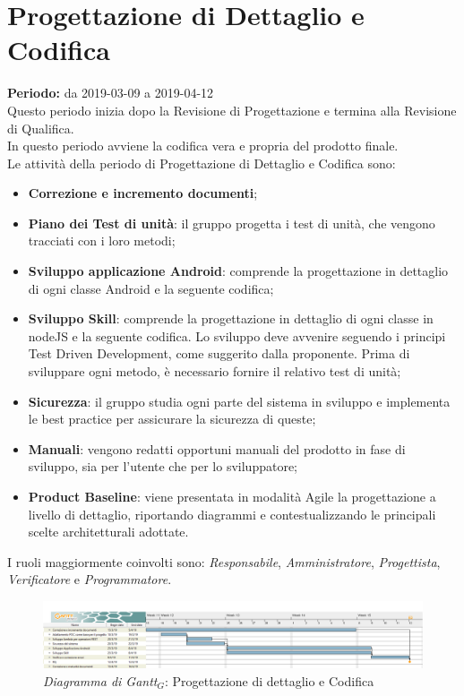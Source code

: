 \section{Progettazione di Dettaglio e Codifica}
\textbf{Periodo:} da 2019-03-09 a 2019-04-12\\
Questo periodo inizia dopo la Revisione di Progettazione e termina  alla Revisione di Qualifica.\\
In questo periodo avviene la codifica vera e propria del prodotto finale.\\
Le attività della periodo di Progettazione di Dettaglio e Codifica sono:
\begin{itemize}
	\item \textbf{Correzione e incremento documenti}; 
	\item \textbf{Piano dei Test di unità}: il gruppo progetta i test di unità, che vengono tracciati con i loro metodi; 
	\item \textbf{Sviluppo applicazione Android}: comprende la progettazione in dettaglio di ogni classe Android e la seguente codifica;
	\item \textbf{Sviluppo Skill}: comprende la progettazione in dettaglio di ogni classe in nodeJS e la seguente codifica. Lo sviluppo deve avvenire seguendo i principi Test Driven Development, come suggerito dalla proponente. Prima di sviluppare ogni metodo, è necessario fornire il relativo test di unità;
	\item \textbf{Sicurezza}: il gruppo studia ogni parte del sistema in sviluppo e implementa le best practice per assicurare la sicurezza di queste;
	\item \textbf{Manuali}: vengono redatti opportuni manuali del prodotto in fase di sviluppo, sia per l'utente che per lo sviluppatore;
	\item \textbf{Product Baseline}: viene presentata in modalità Agile la progettazione a livello di dettaglio, riportando diagrammi e contestualizzando le principali scelte architetturali adottate.
\end{itemize}
I ruoli maggiormente coinvolti sono: \textit{Responsabile}, \textit{Amministratore}, \textit{Progettista}, \textit{Verificatore} e \textit{Programmatore}.
\begin{figure} [h]
    \centering
    \includegraphics[scale=0.27]{./images/ZeroSevenGanttCodifica.png}
    \caption{\textit{Diagramma di Gantt$_{G}$}: Progettazione di dettaglio e Codifica }\label{}
\end{figure}
\newpage
